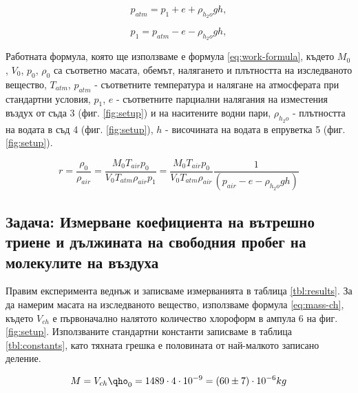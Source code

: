 \documentclass[12pt]{article}
\begin{document}
\begin{equation}\label{eq:p1}
    p_{atm} = p_1 + e + \rho_{h_2o}gh,
\end{equation}

\begin{equation}\label{eq:p1}
    p_1 = p_{atm} - e - \rho_{h_2o}gh,
\end{equation}

Работната формула, която ще използваме е формула \ref{eq:work-formula}, където $M_0$, $V_0$, $p_0$, $\rho_0$ са съответно масата, обемът, налягането и плътността на изследваното вещество, $T_{atm}$, $p_{atm}$ - съответните температура и налягане на атмосферата при стандартни условия, $p_1$, $e$ - съответните парциални налягания на изместения въздух от съда 3 (фиг. \ref{fig:setup}) и на наситените водни пари, $\rho_{h_2o}$ - плътността на водата в съд 4 (фиг. \ref{fig:setup}), $h$ - височината на водата в епруветка 5 (фиг. \ref{fig:setup}).

\begin{equation}\label{eq:work-formula}
    r = \frac{\rho_0}{\rho_{air}} = \frac{M_0 T_{air} p_0}{V_0 T_{atm} \rho_{air} p_{1}} = \frac{M_0 T_{air} p_0}{V_0 T_{atm} \rho_{air}} \frac{1}{\left(p_{air} - e - \rho_{h_2o}gh\right)}
\end{equation}

\subsection{Задача: Измерване коефициента на вътрешно триене и дължината на свободния пробег на молекулите на въздуха}
Правим експеримента веднъж и записваме измерванията в таблица \ref{tbl:results}. За да намерим масата на изследваното вещество, използваме формула \ref{eq:mass-ch}, където $V_{ch}$ е първоначално налятото количество хлороформ в ампула 6 на фиг. \ref{fig:setup}. Използваните стандартни константи записваме в таблица \ref{tbl:constants}, като тяхната грешка е половината от най-малкото записано деление.

\begin{equation}\label{eq:mass-ch}
    M = V_{ch}\qho_0 = 1489 \cdot 4 \cdot 10^{-9} = (60 \pm 7) \cdot 10^{-6} kg    
\end{equation}
\end{document}
